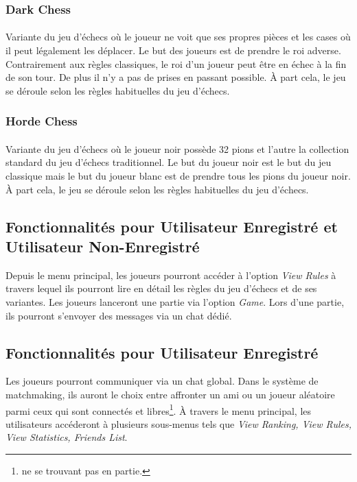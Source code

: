 \documentclass[10pt, a4paper]{article}
\begin{document}
				\subsubsection{Dark Chess}
					\paragraph{}Variante du jeu d'échecs où le joueur ne voit que ses propres pièces et les cases où il peut légalement les déplacer. Le but des joueurs est de prendre le roi adverse. Contrairement aux règles classiques, le roi d'un joueur peut être en échec à la fin de son tour. De plus il n'y a pas de prises en passant possible. À part cela, le jeu se déroule selon les règles habituelles du jeu d'échecs.
				\subsubsection{Horde Chess}
					\paragraph{} Variante du jeu d'échecs où le joueur noir possède 32 pions et l'autre la collection standard du jeu d'échecs traditionnel. Le but du joueur noir est le but du jeu classique mais le but du joueur blanc est de prendre tous les pions du joueur noir. À part cela, le jeu se déroule selon les règles habituelles du jeu d'échecs.

			\subsection{Fonctionnalités pour Utilisateur Enregistré et Utilisateur Non-Enregistré}Depuis le menu principal, les joueurs pourront accéder à l'option {\itshape View Rules} à travers lequel ils pourront lire en détail les règles du jeu d'échecs et de ses variantes. Les joueurs lanceront une partie via l'option {\itshape Game}. Lors d'une partie, ils pourront s'envoyer des messages via un chat dédié.

			\subsection{Fonctionnalités pour Utilisateur Enregistré}Les joueurs pourront communiquer via un chat global. Dans le système de matchmaking, ils auront le choix entre affronter un ami ou un joueur aléatoire parmi ceux qui sont connectés et libres\footnote{ne se trouvant pas en partie.}. À travers le menu principal, les utilisateurs accéderont à plusieurs sous-menus tels que {\itshape View Ranking, View Rules, View Statistics, Friends List}.%
\end{document}
